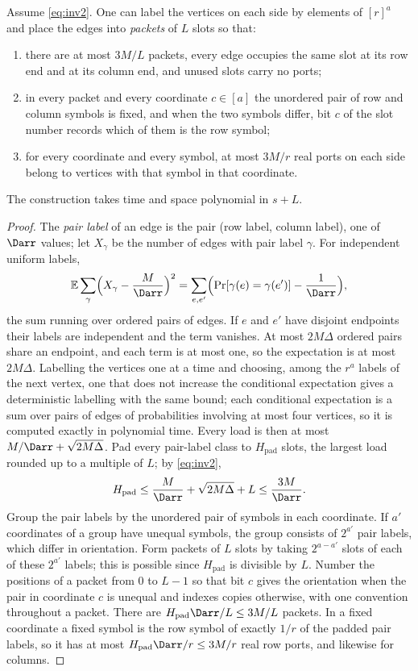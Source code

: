 \begin{lemma}[Packing]\label{lem:packing}
Assume \eqref{eq:inv2}. One can label the vertices on each side by elements of
$[r]^a$ and place the edges into \emph{packets} of $L$ slots so that:
\begin{enumerate}[label=\textup{(\arabic*)},leftmargin=2.2em]
\item there are at most $3M/L$ packets, every edge occupies the same slot at its
row end and at its column end, and unused slots carry no ports;
\item in every packet and every coordinate $c\in[a]$ the unordered pair of row
and column symbols is fixed, and when the two symbols differ, bit $c$ of the
slot number records which of them is the row symbol;
\item for every coordinate and every symbol, at most $3M/r$ real ports on each
side belong to vertices with that symbol in that coordinate.
\end{enumerate}
The construction takes time and space polynomial in $s+L$.
\end{lemma}

\begin{proof}
The \emph{pair label} of an edge is the pair (row label, column label), one of
$\Darr$ values; let $X_\gamma$ be the number of edges with pair label $\gamma$.
For independent uniform labels,
\[
\mathbb E\sum_\gamma\Bigl(X_\gamma-\frac M{\Darr}\Bigr)^2
=\sum_{e,e'}\Bigl(\Pr[\gamma(e)=\gamma(e')]-\frac1{\Darr}\Bigr),
\]
the sum running over ordered pairs of edges. If $e$ and $e'$ have disjoint
endpoints their labels are independent and the term vanishes. At most $2M\Delta$
ordered pairs share an endpoint, and each term is at most one, so the
expectation is at most $2M\Delta$. Labelling the vertices one at a time and
choosing, among the $r^a$ labels of the next vertex, one that does not increase
the conditional expectation \cite{Rag88} gives a deterministic labelling with
the same bound; each conditional expectation is a sum over pairs of edges of
probabilities involving at most four vertices, so it is computed exactly in
polynomial time. Every load is then at most $M/\Darr+\sqrt{2M\Delta}$. Pad every
pair-label class to $H_{\mathrm{pad}}$ slots, the largest load rounded up to a
multiple of $L$; by \eqref{eq:inv2},
\[
H_{\mathrm{pad}}\le\frac M{\Darr}+\sqrt{2M\Delta}+L\le\frac{3M}{\Darr}.
\]
Group the pair labels by the unordered pair of symbols in each coordinate. If
$a'$ coordinates of a group have unequal symbols, the group consists of $2^{a'}$
pair labels, which differ in orientation. Form packets of $L$ slots by taking
$2^{a-a'}$ slots of each of these $2^{a'}$ labels; this is possible since
$H_{\mathrm{pad}}$ is divisible by $L$. Number the positions of a packet from $0$
to $L-1$ so that bit $c$ gives the orientation when the pair in coordinate $c$ is
unequal and indexes copies otherwise, with one convention throughout a packet.
There are $H_{\mathrm{pad}}\Darr/L\le3M/L$ packets. In a fixed coordinate a fixed
symbol is the row symbol of exactly $1/r$ of the padded pair labels, so it has at
most $H_{\mathrm{pad}}\Darr/r\le3M/r$ real row ports, and likewise for columns.
\end{proof}

